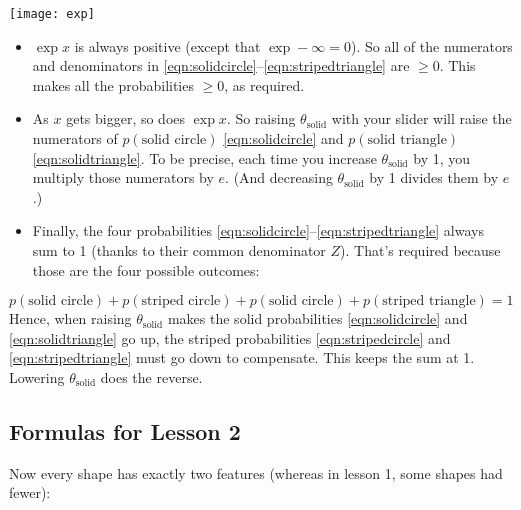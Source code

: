 \documentclass[11pt]{article}
\begin{document}
\texttt{[image: exp]}
\begin{minipage}[b]{4in}
\vspace{4pt}
\begin{itemize}

\item $\exp x$ is always positive (except that $\exp
  -\infty=0$).  So all of the numerators and denominators in \eqref{eqn:solidcircle}--\eqref{eqn:stripedtriangle} are
  $\geq 0$.  This makes all the probabilities $\geq 0$, as required.

\item As $x$ gets bigger, so does $\exp x$.  So raising
  $\theta_{\textrm{solid}}$ with your slider will raise the numerators
  of $p(\text{solid circle})$ \eqref{eqn:solidcircle} and $p(\text{solid triangle})$
  \eqref{eqn:solidtriangle}.  To be precise, each time you increase
  $\theta_{\textrm{solid}}$ by 1, you multiply those numerators by
  $e$.  (And decreasing $\theta_{\textrm{solid}}$ by 1 divides them by $e$.)

\item Finally, the four probabilities
  \eqref{eqn:solidcircle}--\eqref{eqn:stripedtriangle} always sum to 1
  (thanks to their common denominator $Z$).  That's required because
  those are the four possible outcomes:
\end{itemize}
\end{minipage}
\vspace{-6pt}
\begin{equation}
  p(\text{solid circle}) + p(\text{striped circle}) + p(\text{solid circle}) + p(\text{striped triangle}) = 1
\end{equation}
Hence, when raising $\theta_{\textrm{solid}}$ makes the solid
probabilities \eqref{eqn:solidcircle} and \eqref{eqn:solidtriangle} go
up, the striped probabilities \eqref{eqn:stripedcircle} and
\eqref{eqn:stripedtriangle} must go down to compensate.
This keeps the sum at 1.  Lowering $\theta_{\textrm{solid}}$ does the reverse.

\subsection{Formulas for Lesson 2}

Now every shape has exactly two features (whereas in lesson 1, some shapes had fewer):
\end{document}
